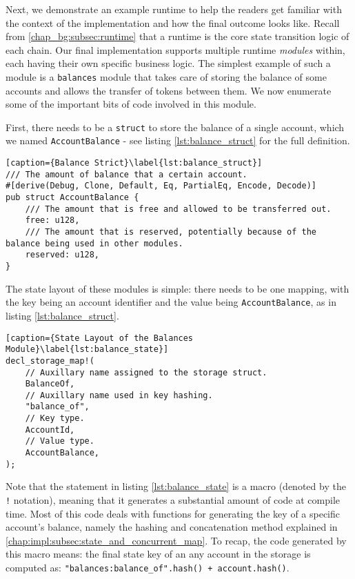 Next, we demonstrate an example runtime to help the readers get familiar with the context of the
implementation and how the final outcome looks like. Recall from \ref{chap_bg:subsec:runtime} that
a runtime is the core state transition logic of each chain. Our final implementation supports
multiple runtime \textit{modules} within, each having their own specific business logic. The
simplest example of such a module is a \texttt{balances} module that takes care of storing the balance
of some accounts and allows the transfer of tokens between them. We now enumerate some of the
important bits of code involved in this module.

First, there needs to be a \texttt{struct} to store the balance of a single account, which we named
\texttt{AccountBalance} - see listing \ref{lst:balance_struct} for the full definition.

\begin{lstlisting}[caption={Balance Strict}\label{lst:balance_struct}]
/// The amount of balance that a certain account.
#[derive(Debug, Clone, Default, Eq, PartialEq, Encode, Decode)]
pub struct AccountBalance {
    /// The amount that is free and allowed to be transferred out.
    free: u128,
    /// The amount that is reserved, potentially because of the balance being used in other modules.
    reserved: u128,
}
\end{lstlisting}

The state layout of these modules is simple: there needs to be one mapping, with the key being an
account identifier and the value being \texttt{AccountBalance}, as in listing
\ref{lst:balance_struct}.

\begin{lstlisting}[caption={State Layout of the Balances Module}\label{lst:balance_state}]
decl_storage_map!(
    // Auxillary name assigned to the storage struct.
    BalanceOf,
    // Auxillary name used in key hashing.
    "balance_of",
    // Key type.
    AccountId,
    // Value type.
    AccountBalance,
);
\end{lstlisting}

Note that the statement in listing \ref{lst:balance_state} is a macro (denoted by the \texttt{!}
notation), meaning that it generates a substantial amount of code at compile time. Most of this code
deals with functions for generating the key of a specific account's balance, namely the hashing and
concatenation method explained in \ref{chap:impl:subsec:state_and_concurrent_map}. To recap, the
code generated by this macro means: the final state key of an any account in the storage is computed
as: \texttt{"balances:balance\_of".hash() + account.hash()}.

